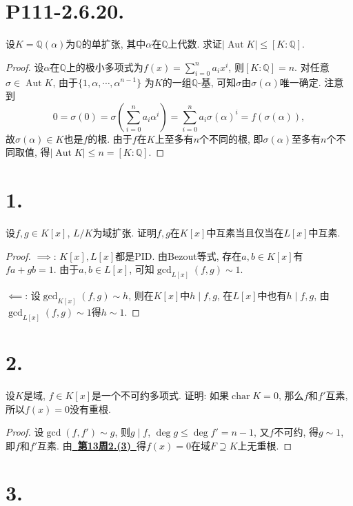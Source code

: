 \documentclass[12pt, a4paper, fontset=windows]{ctexart}
\newcommand{\Q}{\mathbb{Q}}
\newcommand{\Aut}{\operatorname{Aut}}
\newcommand{\abs}[1]{\left|{#1}\right|}
\newcommand{\ch}{\operatorname{char}}
\newcommand{\myref}[2][]{\hyperref[#1]{\bf\color{blue}\ {#2}\ }}
\begin{document}
\section*{P111-2.6.20.}

设$K=\Q(\alpha)$为$\Q$的单扩张, 其中$\alpha$在$\Q$上代数. 
求证$\abs{\Aut K}\le[K:\Q]$. 

\begin{proof}
设$\alpha$在$\Q$上的极小多项式为$f(x)=\sum^n_{i=0}a_ix^i$, 则$[K:\Q]=n$. 
对任意$\sigma\in\Aut K$, 由于$\{1,\alpha,\cdots,\alpha^{n-1}\}$
为$K$的一组$\Q$-基, 可知$\sigma$由$\sigma(\alpha)$唯一确定. 注意到
\[0=\sigma(0)=\sigma(\sum^n_{i=0}a_i\alpha^i)=\sum^n_{i=0}a_i\sigma(\alpha)^i=f(\sigma(\alpha)),\]
故$\sigma(\alpha)\in K$也是$f$的根. 由于$f$在$K$上至多有$n$个不同的根, 
即$\sigma(\alpha)$至多有$n$个不同取值, 得$\abs{\Aut K}\le n=[K:\Q]$. 
\end{proof}

\section*{1.}

设$f,g\in K[x]$, $L/K$为域扩张. 
证明$f,g$在$K[x]$中互素当且仅当在$L[x]$中互素. 

\begin{proof}
$\implies$: $K[x],L[x]$都是PID. 由Bezout等式, 存在$a,b\in K[x]$有
$fa+gb=1$. 由于$a,b\in L[x]$, 可知$\gcd_{L[x]}(f,g)\sim 1$. 

$\impliedby$: 设$\gcd_{K[x]}(f,g)\sim h$, 
则在$K[x]$中$h\mid f,g$, 在$L[x]$中也有$h\mid f,g$, 
由$\gcd_{L[x]}(f,g)\sim 1$得$h\sim 1$. 
\end{proof}

\section*{2.}

设$K$是域, $f\in K[x]$是一个不可约多项式. 证明: 
如果$\ch K=0$, 那么$f$和$f'$互素, 所以$f(x)=0$没有重根. 

\begin{proof}
设$\gcd(f,f')\sim g$, 则$g\mid f$, $\deg g\le\deg f'=n-1$, 
又$f$不可约, 得$g\sim 1$, 即$f$和$f'$互素. 
由\myref[irr-no-dbl-rt]{第13周2.(3)}得$f(x)=0$在域$F\supseteq K$上无重根. 
\end{proof}

\section*{3.}
\end{document}
